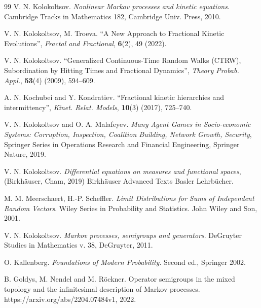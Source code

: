 \documentclass[12pt]{article}
\numberwithin{equation}{section}
\begin{document}
\begin{thebibliography}{99}
V. N. Kolokoltsov. {\it Nonlinear Markov processes and kinetic
	equations}. Cambridge Tracks in Mathematics 182, Cambridge Univ. Press, 2010.

 V. N. Kolokoltsov, M. Troeva. ``A New Approach to Fractional Kinetic Evolutions'', 
{\it Fractal and Fractional}, {\bf 6}(2), 49 (2022).

 V. N. Kolokoltsov. ``Generalized Continuous-Time Random Walks (CTRW),
Subordination by Hitting Times and Fractional Dynamics'',
{\it Theory Probab. Appl.}, {\bf 53}(4) (2009), 594--609.

 A. N. Kochubei and Y. Kondratiev. ``Fractional kinetic hierarchies and intermittency'',
{\it Kinet. Relat. Models}, {\bf 10}(3) (2017), 725--740.


V. N. Kolokoltsov and O. A. Malafeyev.
{\it Many Agent Games in Socio-economic Systems:
	Corruption, Inspection, Coalition Building, Network Growth, Security},
Springer Series in Operations Research and Financial Engineering, Springer Nature, 2019.


 V. N. Kolokoltsov.
{\it Differential equations on measures and functional spaces},
(Birkh\"auser, Cham, 2019) Birkh\"auser Advanced Texts Basler Lehrb\"ucher.


 M. M. Meerschaert, H.-P. Scheffler. {\it Limit
Distributions for Sums of Independent Random Vectors}. Wiley Series
in Probability and Statistics. John Wiley and Son, 2001.

V. N. Kolokoltsov. {\it Markov processes, semigroups and generators}.
DeGruyter Studies in Mathematics v. 38, DeGruyter, 2011.

 O. Kallenberg. {\it Foundations of Modern Probability}.
Second ed., Springer 2002.


B. Goldys, M. Nendel and M. R\"ockner. Operator semigroups in the mixed 
topology and the infinitesimal description of Markov processes. https://arxiv.org/abs/2204.07484v1, 2022.


\end{thebibliography}
\end{document}
